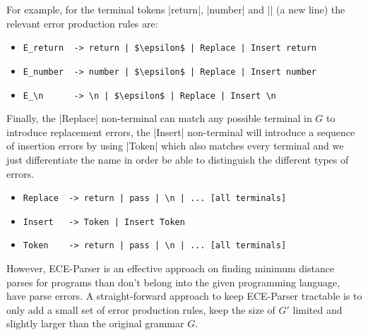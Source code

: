 For example, for the terminal tokens |return|, |number| and |\n| (a new line)
the relevant error production rules are:
\begin{itemize}
  \item \lstinline{E_return  -> return | $\epsilon$ | Replace | Insert return}
  \item \lstinline{E_number  -> number | $\epsilon$ | Replace | Insert number}
  \item \lstinline{E_\n      -> \n | $\epsilon$ | Replace | Insert \n}
\end{itemize}
Finally, the |Replace| non-terminal can match any possible terminal in $G$ to
introduce replacement errors, the |Insert| non-terminal will introduce a
sequence of insertion errors by using |Token| which also matches every terminal
and we just differentiate the name in order be able to distinguish the different
types of errors.
\begin{itemize}
  \item \lstinline{Replace  -> return | pass | \n | ... [all terminals]}
  \item \lstinline{Insert   -> Token | Insert Token}
  \item \lstinline{Token    -> return | pass | \n | ... [all terminals]}
\end{itemize}







However, ECE-Parser is an effective approach on finding minimum distance parses for
programs than don't belong into the given programming language, \ie have parse
errors. A straight-forward approach to keep ECE-Parser tractable is to only add a
small set of error production rules, \ie keep the size of $G'$ limited and
slightly larger than the original grammar $G$.


